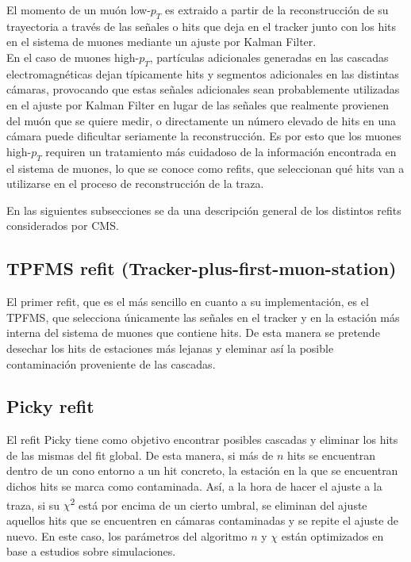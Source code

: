 
El momento de un mu\'on low-$p_{T}$ es extraido a partir de la reconstrucci\'on de su trayectoria a trav\'es de las se\~nales o hits que deja en el tracker junto con los hits en el sistema de muones mediante un ajuste por Kalman Filter. \\

En el caso de muones high-$p_{T}$, part\'iculas adicionales generadas en las cascadas electromagn\'eticas dejan t\'ipicamente hits y segmentos adicionales en las distintas c\'amaras, provocando que estas se\~nales adicionales sean probablemente utilizadas en el ajuste por Kalman Filter en lugar de las se\~nales que realmente provienen del mu\'on que se quiere medir, o directamente un n\'umero elevado de hits en una c\'amara puede dificultar seriamente la reconstrucci\'on. Es por esto que los muones high-$p_{T}$ requiren un tratamiento m\'as cuidadoso de la informaci\'on encontrada en el sistema de muones, lo que se conoce como refits, que seleccionan qu\'e hits van a utilizarse en el proceso de reconstrucci\'on de la traza. 

En las siguientes subsecciones se da una descripci\'on general de los distintos refits considerados por CMS.

\subsection{TPFMS refit (Tracker-plus-first-muon-station)}\label{sec:TPFMS}

El primer refit, que es el m\'as sencillo en cuanto a su implementaci\'on, es el TPFMS, que selecciona \'unicamente las se\~nales en el tracker y en la estaci\'on m\'as interna del sistema de muones que contiene hits. De esta manera se pretende desechar los hits de estaciones m\'as lejanas y eleminar as\'i la posible contaminaci\'on proveniente de las cascadas.

\subsection{Picky refit}\label{sec:Picky}

El refit Picky tiene como objetivo encontrar posibles cascadas y eliminar los hits de las mismas del fit global. De esta manera, si m\'as de $n$ hits se encuentran dentro de un cono entorno a un hit concreto, la estaci\'on en la que se encuentran dichos hits se marca como contaminada. As\'i, a la hora de hacer el ajuste a la traza, si su $\chi$\textsuperscript{2} est\'a por encima de un cierto umbral, se eliminan del ajuste aquellos hits que se encuentren en c\'amaras contaminadas y se repite el ajuste de nuevo. En este caso, los par\'ametros del algoritmo $n$ y $\chi$ est\'an optimizados en base a estudios sobre simulaciones.

